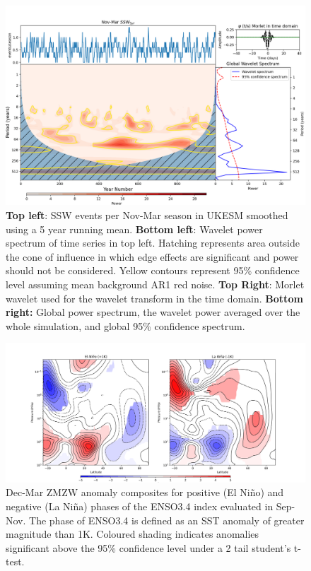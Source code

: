 \documentclass[wcd, manuscript]{copernicus}
\begin{document}
\begin{center}
\begin{figure}[h!]
\noindent\includegraphics[width = 0.8\linewidth]{new_changed_figures/SSW_wavelet_5_yr_fig3_new_levels_NDJFM.png}
\caption{\textbf{Top left}: SSW events per Nov-Mar season in UKESM smoothed using a 5 year running mean. \textbf{Bottom left}: Wavelet power spectrum of time series in top left. Hatching represents area outside the cone of influence in which edge effects are significant and power should not be considered. Yellow contours represent 95\% confidence level assuming mean background AR1 red noise. \textbf{Top Right}: Morlet wavelet used for the wavelet transform in the time domain. \textbf{Bottom right:} Global power spectrum, the wavelet power averaged over the whole simulation, and global 95\% confidence spectrum.}
\label{fig3}
\end{figure}
\end{center}

\begin{center}
\begin{figure}[h!]
\noindent\includegraphics[width = \linewidth]{new_changed_figures/ZMZW_ENSO_phase_1K.png}
\caption{Dec-Mar ZMZW anomaly composites for positive (El Ni\~{n}o) and negative (La Ni\~{n}a) phases of the ENSO3.4 index evaluated in Sep-Nov. The phase of ENSO3.4 is defined as an SST anomaly of greater magnitude than 1K. Coloured shading indicates anomalies significant above the 95\% confidence level under a 2 tail student’s t-test.}
\label{fig3}
\end{figure}
\end{center}
\end{document}
